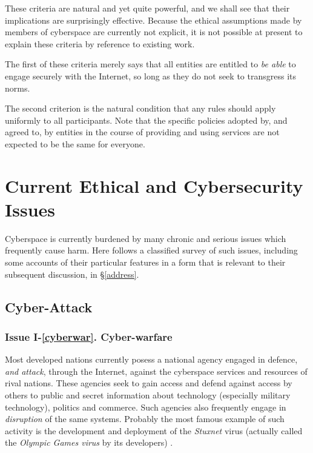 These criteria are natural and yet quite powerful, and we shall see that their implications are surprisingly effective. Because the ethical assumptions made by members of cyberspace are currently not explicit, it is not possible at present to explain these criteria by reference to existing work.

The first of these criteria merely says that all entities are entitled to {\em be able} to engage securely with the Internet, so long as they do not seek to transgress its norms.

The second criterion is the natural condition that any rules should apply uniformly to all participants. Note that the specific policies adopted by, and agreed to, by entities in the course of providing and using services are not expected to be the same for everyone.

\section{Current Ethical and Cybersecurity Issues}\label{issues}

Cyberspace is currently burdened by many chronic and serious issues which frequently cause harm. Here follows a classified survey of such issues, including some accounts of their particular features in a form that is relevant to their subsequent discussion, in \S \ref{address}.

\subsection{Cyber-Attack}\label{cybattk}

\subsubsection*{Issue I-\ref{cyberwar}. {Cyber-warfare}}\label{cyberwarsol}
%
Most developed nations currently posess a national agency
engaged in defence, {\em and attack}, through the Internet,
against the cyberspace services and resources of rival nations.
These agencies seek to gain access and defend against
access by others to public and secret information
about technology (especially military technology),
politics and commerce. 
Such agencies also frequently engage in {\em disruption} of the same systems. Probably
the most famous example of such activity is the development
and deployment of the {\em Stuxnet} virus (actually called the 
{\em Olympic Games virus} by its developers)  \cite{kushner2013real,langner2011stuxnet} .


